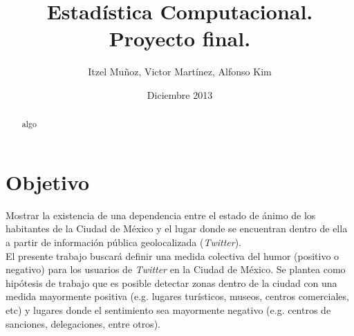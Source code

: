 \documentclass{article}
\author{Itzel Muñoz, Victor Martínez, Alfonso Kim}
\date{Diciembre 2013}
\title{Estadística Computacional. Proyecto final.}
\begin{document}
\tableofcontents
\thispagestyle{empty}

\maketitle
\thispagestyle{empty}

\newpage

\begin{abstract}
algo
\end{abstract}

\section{Objetivo}
		Mostrar la existencia de una dependencia entre el estado de ánimo de los habitantes de la Ciudad de México y el lugar donde se encuentran dentro de ella a partir de información pública geolocalizada (\emph{Twitter}).\\[.3cm]
%
El presente trabajo buscará definir una medida colectiva del humor (positivo o negativo) para los usuarios de \emph{Twitter} en la Ciudad de México. Se plantea como hipótesis de trabajo que es posible detectar zonas dentro de la ciudad con una medida mayormente positiva (e.g. lugares turísticos, museos, centros comerciales, etc) y lugares donde el sentimiento sea mayormente negativo (e.g. centros de sanciones, delegaciones, entre otros). 
\end{document}
